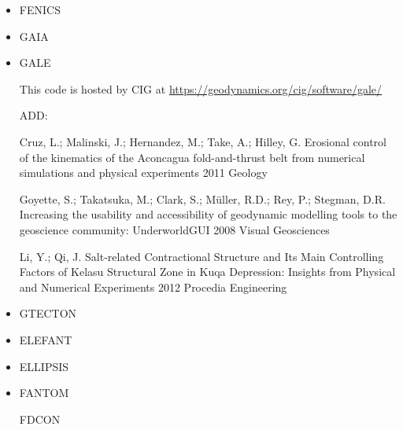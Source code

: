\begin{itemize}
\item FENICS
\cite{alrk14}


\item GAIA

\item GALE

This code is hosted by CIG at \url{https://geodynamics.org/cig/software/gale/}

\cite{fabs08}
\cite{beve10}
\cite{cmwt10}
\cite{lehm12}
\cite{arbi13}

ADD:


Cruz, L.; Malinski, J.; Hernandez, M.; Take, A.; Hilley, G. 	Erosional control of the kinematics of the Aconcagua fold-and-thrust belt from numerical simulations and physical experiments 	2011 	Geology

	
Goyette, S.; Takatsuka, M.; Clark, S.; Müller, R.D.; Rey, P.; Stegman, D.R. 	Increasing the usability and accessibility of geodynamic modelling tools to the geoscience community: UnderworldGUI 	2008 	Visual Geosciences
	
Li, Y.; Qi, J. 	Salt-related Contractional Structure and Its Main Controlling Factors of Kelasu Structural Zone in Kuqa Depression: Insights from Physical and Numerical Experiments 	2012 	Procedia Engineering






\item GTECTON
\cite{gowo95}
\cite{gowo99}
\cite{bugw01}
\cite{bugw02}
\cite{gowo05}
\cite{degw06}
\cite{libi06}
\cite{bagw11}
\cite{bagw11b}
\cite{mags15}




\item ELEFANT

\cite{tosn15}
\cite{matv15}
\cite{busa16}
\cite{latb17}
\cite{thie17}
\cite{pltv18}

\item ELLIPSIS

\cite{modm03}
\cite{omma06} 
\cite{moql07}
\cite{dyrm07}
\cite{onlg08}
\cite{pyeg10}
\cite{legu11}
\cite{lega12}


\item FANTOM

\cite{thie11}
\cite{alht11}
\cite{alht12}
\cite{alhf13}
\cite{erhv14}
\cite{thsh14}
\cite{erhv15}
\cite{erhv19}

\index FDCON
\cite{enbs05}
\cite{fusc13}
\cite{fuks15}



\end{itemize}
